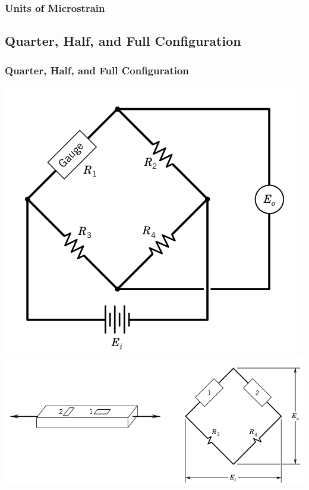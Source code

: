 \documentclass[fleqn]{beamer} %
\newcommand{\sectionIIIsubsectionItitle}{Units of Microstrain}
\newcommand{\sectionIIIsubsectionIItitle}{Quarter, Half, and Full Configuration}
\begin{document}
			\begin{frame}
				\frametitle{\sectionIIIsubsectionItitle}
		
			\end{frame}

		\subsection{\sectionIIIsubsectionIItitle}\label{sectionIIIsubsectionII}	

			\begin{frame}
				\frametitle{\sectionIIIsubsectionIItitle}

				\bigskip

				\includegraphics[scale=.2]{images/gauge_in_bridge_quarter.png} 
				\includegraphics[scale=.2]{images/gauge_in_bridge_half.png} 

\end{frame}
\end{document}
